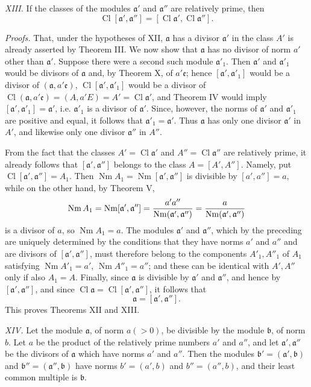 \documentclass[11pt,a4paper]{article}
\newcommand{\Cl}{\operatorname{Cl}}
\newcommand{\Nm}{\operatorname{Nm}}
\begin{document}
\emph{XIII.} If the classes of the modules $\mathfrak a'$ and $\mathfrak a''$ are relatively prime, then
\[
 \Cl[\mathfrak a',\mathfrak a'']=[\Cl\mathfrak a',\Cl\mathfrak a''].
\]

\emph{Proofs.} That, under the hypotheses of XII, $\mathfrak a$ has a divisor $\mathfrak a'$ in the class $A'$ is already asserted by Theorem III. We now show that $\mathfrak a$ has no divisor of norm $a'$ other than $\mathfrak a'$. Suppose there were a second such module $\mathfrak a'_1$. Then $\mathfrak a'$ and $\mathfrak a'_1$ would be divisors of $\mathfrak a$ and, by Theorem X, of $a'\mathfrak e$; hence $[\mathfrak a',\mathfrak a'_1]$ would be a divisor of $(\mathfrak a,a'\mathfrak e)$, $\Cl[\mathfrak a',\mathfrak a'_1]$ would be a divisor of $\Cl(\mathfrak a,a'\mathfrak e)=(A,a'E)=A'=\Cl\mathfrak a'$, and Theorem IV would imply $[\mathfrak a',\mathfrak a'_1]=\mathfrak a'$, i.e. $\mathfrak a'_1$ is a divisor of $\mathfrak a'$. Since, however, the norms of $\mathfrak a'$ and $\mathfrak a'_1$ are positive and equal, it follows that $\mathfrak a'_1=\mathfrak a'$. Thus $\mathfrak a$ has only one divisor $\mathfrak a'$ in $A'$, and likewise only one divisor $\mathfrak a''$ in $A''$.

From the fact that the classes $A'=\Cl\mathfrak a'$ and $A''=\Cl\mathfrak a''$ are relatively prime, it already follows that $[\mathfrak a',\mathfrak a'']$ belongs to the class $A=[A',A'']$. Namely, put $\Cl[\mathfrak a',\mathfrak a'']=A_1$. Then $\Nm A_1=\Nm[\mathfrak a',\mathfrak a'']$ is divisible by $[a',a'']=a$, while on the other hand, by Theorem V,
\[
 \Nm A_1=\Nm[\mathfrak a',\mathfrak a'']
 ={a'a''\over \Nm(\mathfrak a',\mathfrak a'')}
 ={a\over \Nm(\mathfrak a',\mathfrak a'')}
\]
is a divisor of $a$, so $\Nm A_1=a$. The modules $\mathfrak a'$ and $\mathfrak a''$, which by the preceding are uniquely determined by the conditions that they have norms $a'$ and $a''$ and are divisors of $[\mathfrak a',\mathfrak a'']$, must therefore belong to the components $A'_1,A''_1$ of $A_1$ satisfying $\Nm A'_1=a'$, $\Nm A''_1=a''$; and these can be identical with $A',A''$ only if also $A_1=A$. Finally, since $\mathfrak a$ is divisible by $\mathfrak a'$ and $\mathfrak a''$, and hence by $[\mathfrak a',\mathfrak a'']$, and since $\Cl\mathfrak a=\Cl[\mathfrak a',\mathfrak a'']$, it follows that
\[
 \mathfrak a=[\mathfrak a',\mathfrak a''].
\]
This proves Theorems XII and XIII.

\emph{XIV.} Let the module $\mathfrak a$, of norm $a(>0)$, be divisible by the module $\mathfrak b$, of norm $b$. Let $a$ be the product of the relatively prime numbers $a'$ and $a''$, and let $\mathfrak a',\mathfrak a''$ be the divisors of $\mathfrak a$ which have norms $a'$ and $a''$. Then the modules $\mathfrak b'=(\mathfrak a',\mathfrak b)$ and $\mathfrak b''=(\mathfrak a'',\mathfrak b)$ have norms $b'=(a',b)$ and $b''=(a'',b)$, and their least common multiple is $\mathfrak b$.
\end{document}

